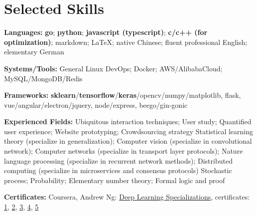 \section{\textbf{Selected Skills}}
\resumeSubHeadingListStart
\item{
  \textbf{Languages:}{ 
    \textbf{go}; \textbf{python}; 
    \textbf{javascript (typescript)}; 
    \textbf{c/c++ (for optimization)}; 
    markdown; \LaTeX; 
    native Chinese; fluent professional English; elementary German
  }
}
\item{
 \textbf{Systems/Tools:}{ General Linux DevOps; Docker; AWS/AlibabaCloud; MySQL/MongoDB/Redis}
}
\item{
 \textbf{Frameworks:}{ \textbf{sklearn}/\textbf{tensorflow}/\textbf{keras}/opencv/numpy/matplotlib, flask, vue/angular/electron/jquery, node/express, beego/gin-gonic}
}
\item{
  \textbf{Experienced Fields:}{ 
    \resumeItemListStart
        { 
          Ubiquitous interaction techniques; 
          User study; 
          Quantified user experience; 
          Website prototyping; 
          Crowdsourcing strategy
        }
        { 
          Statistical learning theory (specialize in generalization); 
          Computer vision (specialize in convolutional network); 
          Computer networks (specialize in transport layer protocols); 
          Nature language processing (specialize in recurrent network methods); 
          Distributed computing (specialize in microservices and consensus protocols)
        }
        { 
          Stochastic process; 
          Probability; 
          Elementary number theory; 
          Formal logic and proof
        }
   \resumeItemListEnd
  }
}
\item{
  \textbf{Certificates:}{
    Coursera, Andrew Ng: \href{https://www.coursera.org/account/accomplishments/specialization/QGH8ZVJ6J2L2}{Deep Learning Specializations}, certificates:
    \href{https://www.coursera.org/account/accomplishments/verify/YH4NT7HHN263}{1}, 
    \href{https://www.coursera.org/account/accomplishments/verify/QGH3GNGF6BM4}{2}, 
    \href{https://www.coursera.org/account/accomplishments/verify/6VU45R2SZEF6}{3},
    \href{https://www.coursera.org/account/accomplishments/verify/LF3K9BQQDLVL}{4},
    \href{https://www.coursera.org/account/accomplishments/verify/JQFLW2DPYAGW}{5}
  }
}
\resumeSubHeadingListEnd